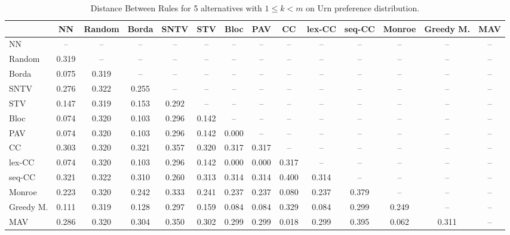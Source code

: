 
\begin{table*}
\centering
\begin{tabular}{lccccccccccccc}
\toprule
 & NN & Random & Borda & SNTV & STV & Bloc & PAV & CC & lex-CC & seq-CC & Monroe & Greedy M. & MAV \\
\midrule
NN & -- & -- & -- & -- & -- & -- & -- & -- & -- & -- & -- & -- & -- \\
Random & 0.319 & -- & -- & -- & -- & -- & -- & -- & -- & -- & -- & -- & -- \\
Borda & 0.075 & 0.319 & -- & -- & -- & -- & -- & -- & -- & -- & -- & -- & -- \\
SNTV & 0.276 & 0.322 & 0.255 & -- & -- & -- & -- & -- & -- & -- & -- & -- & -- \\
STV & 0.147 & 0.319 & 0.153 & 0.292 & -- & -- & -- & -- & -- & -- & -- & -- & -- \\
Bloc & 0.074 & 0.320 & 0.103 & 0.296 & 0.142 & -- & -- & -- & -- & -- & -- & -- & -- \\
PAV & 0.074 & 0.320 & 0.103 & 0.296 & 0.142 & 0.000 & -- & -- & -- & -- & -- & -- & -- \\
CC & 0.303 & 0.320 & 0.321 & 0.357 & 0.320 & 0.317 & 0.317 & -- & -- & -- & -- & -- & -- \\
lex-CC & 0.074 & 0.320 & 0.103 & 0.296 & 0.142 & 0.000 & 0.000 & 0.317 & -- & -- & -- & -- & -- \\
seq-CC & 0.321 & 0.322 & 0.310 & 0.260 & 0.313 & 0.314 & 0.314 & 0.400 & 0.314 & -- & -- & -- & -- \\
Monroe & 0.223 & 0.320 & 0.242 & 0.333 & 0.241 & 0.237 & 0.237 & 0.080 & 0.237 & 0.379 & -- & -- & -- \\
Greedy M. & 0.111 & 0.319 & 0.128 & 0.297 & 0.159 & 0.084 & 0.084 & 0.329 & 0.084 & 0.299 & 0.249 & -- & -- \\
MAV & 0.286 & 0.320 & 0.304 & 0.350 & 0.302 & 0.299 & 0.299 & 0.018 & 0.299 & 0.395 & 0.062 & 0.311 & -- \\
\bottomrule
\end{tabular}

\caption{Distance Between Rules for 5 alternatives with $1 \leq k < m$ on Urn preference distribution.}
\end{table*}
